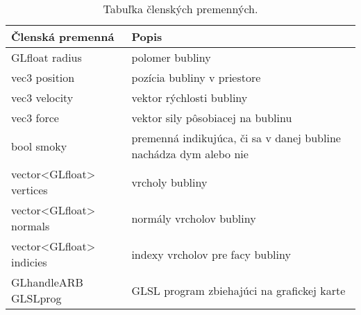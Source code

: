 \begin{table}[H]
	\centering
	\caption{Tabuľka členských premenných.}
	\setlength{\extrarowheight}{2pt}
	\begin{tabularx}{\textwidth}{|X|X|}
		\hline
		\textbf{Členská premenná}               & \textbf{Popis}                                                                          \\ \hline
		GLfloat radius          & polomer bubliny \\ \hline
		vec3 position & pozícia bubliny v priestore \\ \hline
		vec3 velocity                    & vektor rýchlosti bubliny \\ \hline
		vec3 force            & vektor sily pôsobiacej na bublinu \\ \hline
		bool smoky                          & premenná indikujúca, či sa v danej bubline nachádza dym alebo nie \\ \hline
		vector<GLfloat> vertices                          & vrcholy bubliny \\ \hline
		vector<GLfloat> normals                        & normály vrcholov bubliny \\ \hline
		vector<GLfloat> indicies                        & indexy vrcholov pre facy bubliny \\ \hline
		GLhandleARB GLSLprog                    & GLSL program zbiehajúci na grafickej karte \\ \hline
	\end{tabularx}
\end{table}

